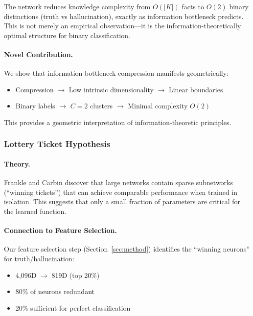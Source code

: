 \documentclass[11pt]{article}
\begin{document}
The network reduces knowledge complexity from $O(|K|)$ facts to $O(2)$ binary distinctions (truth vs hallucination), exactly as information bottleneck predicts. This is not merely an empirical observation---it is the information-theoretically optimal structure for binary classification.

\paragraph{Novel Contribution.}
We show that information bottleneck compression manifests geometrically:
\begin{itemize}
    \item Compression $\rightarrow$ Low intrinsic dimensionality $\rightarrow$ Linear boundaries
    \item Binary labels $\rightarrow$ $C=2$ clusters $\rightarrow$ Minimal complexity $O(2)$
\end{itemize}

This provides a geometric interpretation of information-theoretic principles.

\subsubsection{Lottery Ticket Hypothesis}

\paragraph{Theory.}
Frankle and Carbin \citep{frankle2018lottery} discover that large networks contain sparse subnetworks (``winning tickets'') that can achieve comparable performance when trained in isolation. This suggests that only a small fraction of parameters are critical for the learned function.

\paragraph{Connection to Feature Selection.}
Our feature selection step (Section~\ref{sec:method}) identifies the ``winning neurons'' for truth/hallucination:
\begin{itemize}
    \item 4,096D $\rightarrow$ 819D (top 20\%)
    \item 80\% of neurons redundant
    \item 20\% sufficient for perfect classification
\end{itemize}
\end{document}
